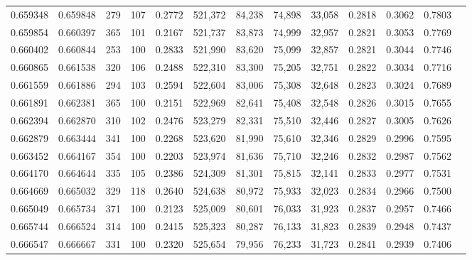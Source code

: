 \begin{tabular}{rrrrrrrrrrrrr}
0.659348 & 0.659848 &    279 &   107 &                                     0.2772 & 521,372 &  84,238 &  74,898 &  33,058 & 0.2818 & 0.3062 & 0.7803 \\
0.659854 & 0.660397 &    365 &   101 &                                     0.2167 & 521,737 &  83,873 &  74,999 &  32,957 & 0.2821 & 0.3053 & 0.7769 \\
0.660402 & 0.660844 &    253 &   100 &                                     0.2833 & 521,990 &  83,620 &  75,099 &  32,857 & 0.2821 & 0.3044 & 0.7746 \\
0.660865 & 0.661538 &    320 &   106 &                                     0.2488 & 522,310 &  83,300 &  75,205 &  32,751 & 0.2822 & 0.3034 & 0.7716 \\
0.661559 & 0.661886 &    294 &   103 &                                     0.2594 & 522,604 &  83,006 &  75,308 &  32,648 & 0.2823 & 0.3024 & 0.7689 \\
0.661891 & 0.662381 &    365 &   100 &                                     0.2151 & 522,969 &  82,641 &  75,408 &  32,548 & 0.2826 & 0.3015 & 0.7655 \\
0.662394 & 0.662870 &    310 &   102 &                                     0.2476 & 523,279 &  82,331 &  75,510 &  32,446 & 0.2827 & 0.3005 & 0.7626 \\
0.662879 & 0.663444 &    341 &   100 &                                     0.2268 & 523,620 &  81,990 &  75,610 &  32,346 & 0.2829 & 0.2996 & 0.7595 \\
0.663452 & 0.664167 &    354 &   100 &                                     0.2203 & 523,974 &  81,636 &  75,710 &  32,246 & 0.2832 & 0.2987 & 0.7562 \\
0.664170 & 0.664644 &    335 &   105 &                                     0.2386 & 524,309 &  81,301 &  75,815 &  32,141 & 0.2833 & 0.2977 & 0.7531 \\
0.664669 & 0.665032 &    329 &   118 &                                     0.2640 & 524,638 &  80,972 &  75,933 &  32,023 & 0.2834 & 0.2966 & 0.7500 \\
0.665049 & 0.665734 &    371 &   100 &                                     0.2123 & 525,009 &  80,601 &  76,033 &  31,923 & 0.2837 & 0.2957 & 0.7466 \\
0.665744 & 0.666524 &    314 &   100 &                                     0.2415 & 525,323 &  80,287 &  76,133 &  31,823 & 0.2839 & 0.2948 & 0.7437 \\
0.666547 & 0.666667 &    331 &   100 &                                     0.2320 & 525,654 &  79,956 &  76,233 &  31,723 & 0.2841 & 0.2939 & 0.7406 \\

\end{tabular}
